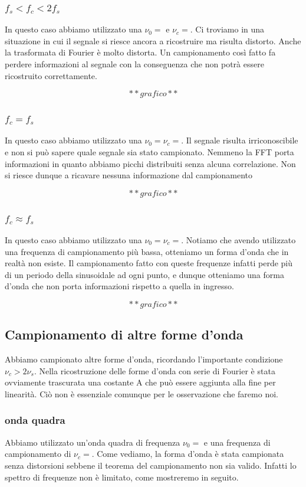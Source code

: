 \subsubsection{ $f_s<f_c<2f_s$}


In questo caso abbiamo utilizzato una $\nu_0=$ e $\nu_c=$. Ci troviamo in una situazione in cui il segnale si riesce ancora a ricostruire ma risulta distorto. Anche la trasformata di Fourier è molto distorta. Un campionamento così fatto fa perdere informazioni al segnale con la conseguenza che non potrà essere ricostruito correttamente.

$$**grafico**$$

\subsubsection{ $f_c = f_s$}

In questo caso abbiamo utilizzato una $\nu_0=\nu_c=$. Il segnale risulta irriconoscibile e non si può sapere quale segnale sia stato campionato. Nemmeno la FFT porta informazioni in quanto abbiamo picchi distribuiti senza alcuna correlazione. Non si riesce dunque a ricavare nessuna informazione dal campionamento

$$**grafico**$$

\subsubsection{ $f_c \approx f_s$}
In questo caso abbiamo utilizzato una $\nu_0=\nu_c=$. Notiamo che avendo utilizzato una frequenza di campionamento più bassa, otteniamo un forma d'onda che in realtà non esiste. Il campionamento fatto con queste frequenze infatti perde più di un periodo della sinusoidale ad ogni punto, e dunque otteniamo una forma d'onda che non porta informazioni rispetto a quella in ingresso.

$$**grafico**$$

\subsection{Campionamento di altre forme d'onda}
Abbiamo campionato altre forme d'onda, ricordando l'importante condizione $\nu_c>2\nu_s$. Nella ricostruzione delle forme d'onda con serie di Fourier è stata ovviamente trascurata una costante A che può essere aggiunta alla fine per linearità. Ciò non è essenziale comunque per le osservazione che faremo noi.


\subsubsection{onda quadra}
Abbiamo utilizzato un'onda quadra di frequenza $\nu_0=$ e una frequenza di campionamento di $\nu_c=$. Come vediamo, la forma d'onda è stata campionata senza distorsioni sebbene il teorema del campionamento non sia valido. Infatti lo spettro di frequenze non è limitato, come mostreremo in seguito.

